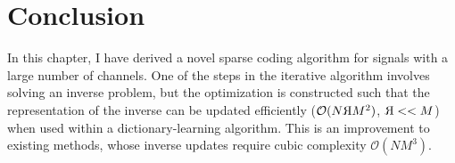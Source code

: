 \section{Conclusion}
In this chapter, I have derived a novel sparse coding algorithm for signals with a large number of channels. One of the steps in the iterative algorithm involves solving an inverse problem, but the optimization is constructed such that the representation of the inverse can be updated efficiently ($\mathcal{O}(N
\reflectbox{R}M^2)$, $
\reflectbox{R} << M$) when used within a dictionary-learning algorithm. This is an improvement to existing methods, whose inverse updates require cubic complexity $\mathcal{O}(NM^3)$.
